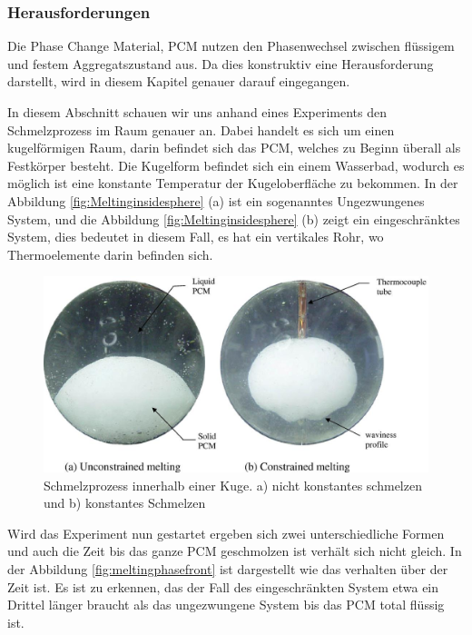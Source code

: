 \documentclass[11pt,a4paper]{scrartcl}
\begin{document}
\subsubsection{Herausforderungen}

Die Phase Change Material, PCM nutzen den Phasenwechsel zwischen flüssigem und festem Aggregatszustand aus. Da dies konstruktiv eine Herausforderung darstellt, wird in diesem Kapitel genauer darauf eingegangen.

In diesem Abschnitt schauen wir uns anhand eines Experiments den Schmelzprozess im Raum genauer an. Dabei handelt es sich um einen kugelförmigen Raum, darin befindet sich das PCM, welches zu Beginn überall als Festkörper besteht. Die Kugelform befindet sich ein einem Wasserbad, wodurch es möglich ist eine konstante Temperatur der Kugeloberfläche zu bekommen. In der Abbildung \ref{fig:Meltinginsidesphere} (a) ist ein sogenanntes Ungezwungenes System, und die Abbildung \ref{fig:Meltinginsidesphere} (b) zeigt ein eingeschränktes System, dies bedeutet in diesem Fall, es hat ein vertikales Rohr, wo Thermoelemente darin befinden sich.

\begin{figure}[h!]
\begin{center}
\includegraphics[scale=0.3]{images/Meltinginsidesphere.jpg}
\caption{Schmelzprozess innerhalb einer Kuge. a) nicht konstantes schmelzen und b) konstantes Schmelzen \cite{WasteEnergyHarvesting}}
\label{fig:meltingpaper}
\end{center}
\end{figure}

Wird das Experiment nun gestartet ergeben sich zwei unterschiedliche Formen und auch die Zeit bis das ganze PCM geschmolzen ist verhält sich nicht gleich. In der Abbildung \ref{fig:meltingphasefront} ist dargestellt wie das verhalten über der Zeit ist. Es ist zu erkennen, das der Fall des eingeschränkten System etwa ein Drittel länger braucht als das ungezwungene System bis das PCM total flüssig ist.
\end{document}
